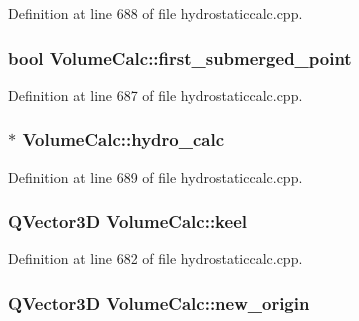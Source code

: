Definition at line 688 of file hydrostaticcalc.\+cpp.

\subsubsection[{\texorpdfstring{first\+\_\+submerged\+\_\+point}{first_submerged_point}}]{\setlength{\rightskip}{0pt plus 5cm}bool Volume\+Calc\+::first\+\_\+submerged\+\_\+point}\hypertarget{structVolumeCalc_a3bc27914e09f86d93cb28daad90dddc1}{}\label{structVolumeCalc_a3bc27914e09f86d93cb28daad90dddc1}


Definition at line 687 of file hydrostaticcalc.\+cpp.

\subsubsection[{\texorpdfstring{hydro\+\_\+calc}{hydro_calc}}]{$\ast$ Volume\+Calc\+::hydro\+\_\+calc}\hypertarget{structVolumeCalc_a5b3b6d4983faa3c309ddc85981945993}{}\label{structVolumeCalc_a5b3b6d4983faa3c309ddc85981945993}


Definition at line 689 of file hydrostaticcalc.\+cpp.

\subsubsection[{\texorpdfstring{keel}{keel}}]{\setlength{\rightskip}{0pt plus 5cm}Q\+Vector3D Volume\+Calc\+::keel}\hypertarget{structVolumeCalc_a07e433d13508d3342e7f6a50604c40d3}{}\label{structVolumeCalc_a07e433d13508d3342e7f6a50604c40d3}


Definition at line 682 of file hydrostaticcalc.\+cpp.

\subsubsection[{\texorpdfstring{new\+\_\+origin}{new_origin}}]{\setlength{\rightskip}{0pt plus 5cm}Q\+Vector3D Volume\+Calc\+::new\+\_\+origin}\hypertarget{structVolumeCalc_aed779c2eace630d0d41239df4d371407}{}\label{structVolumeCalc_aed779c2eace630d0d41239df4d371407}


